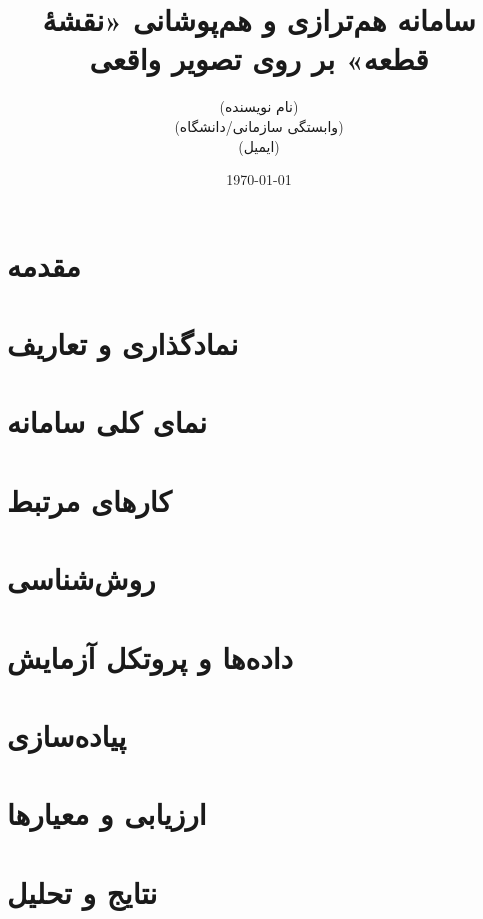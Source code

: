 \documentclass[11pt]{article}
\title{سامانه هم‌ترازی و هم‌پوشانی «نقشهٔ قطعه» بر روی تصویر واقعی}
\author{(نام نویسنده) \\ (وابستگی سازمانی/دانشگاه) \\ (ایمیل)}
\date{\today}
\begin{document}
\maketitle

\begin{abstract}
% 
\end{abstract}

\tableofcontents
\newpage

\section{مقدمه}


\section{نمادگذاری و تعاریف}


\section{نمای کلی سامانه}


\section{کارهای مرتبط}


\section{روش‌شناسی}


\section{داده‌ها و پروتکل آزمایش}




\section{پیاده‌سازی}


\section{ارزیابی و معیارها}


\section{نتایج و تحلیل}

\end{document}
